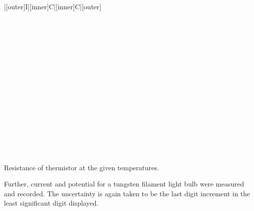 \begin{paper}
{\begin{papertable}{|[outer]I|[inner]C|[inner]C|[outer]}
			\papertableindex{}\\\paperiline
			\papertableindex{}\\\paperiline
			\papertableindex{}\\\paperiline
			\papertableindex{}\\\paperiline
			\papertableindex{}\\\paperiline
			\papertableindex{}\\\paperiline
			\papertableindex{}\\\paperiline
			\papertableindex{}\\\paperiline
			\papertableindex{}\\\paperiline
			\papertableindex{}\\\paperiline
			\papertableindex{}\\\paperiline
			\papertableindex{}\\\paperiline
			\papertableindex{}\\\paperiline
			\papertableindex{}\\\paperiline
			\papertableindex{}\\\paperiline
			\papertableindex{}\\\paperoline
		\end{papertable}\vspace{-1.5em}}
	{Resistance of thermistor at the given temperatures.}\vspace{1em}

	Further, current and potential for a tungsten filament light bulb were measured and recorded. The uncertainty is again taken to be the last digit increment in the least significant digit displayed. 


\end{paper}
